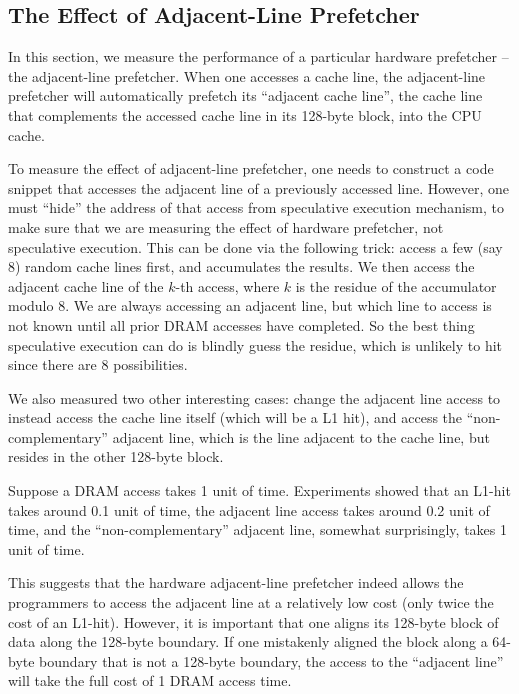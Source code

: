 \documentclass[11pt, usletter]{article}
\begin{document}
\subsection{The Effect of Adjacent-Line Prefetcher} \label{adjlineprefetcher}

In this section, we measure the performance of a particular hardware prefetcher -- the adjacent-line prefetcher. 
When one accesses a cache line, the adjacent-line prefetcher will automatically prefetch 
its ``adjacent cache line'', the cache line that complements the accessed cache line in its 128-byte block, 
into the CPU cache. 

To measure the effect of adjacent-line prefetcher, one needs to construct a code snippet 
that accesses the adjacent line of a previously accessed line. 
However, one must ``hide'' the address of that access from speculative execution mechanism, 
to make sure that we are measuring the effect of hardware prefetcher, not speculative execution. 
This can be done via the following trick: 
access a few (say 8) random cache lines first, and accumulates the results. 
We then access the adjacent cache line of the $k$-th access, where $k$ is the residue of the accumulator modulo 8. 
We are always accessing an adjacent line, 
but which line to access is not known until all prior DRAM accesses have completed.
So the best thing speculative execution can do is blindly guess the residue, 
which is unlikely to hit since there are 8 possibilities. 

We also measured two other interesting cases: 
change the adjacent line access to instead access the cache line itself (which will be a L1 hit), 
and access the ``non-complementary'' adjacent line, which is the line adjacent to the cache line, 
but resides in the other 128-byte block.

Suppose a DRAM access takes 1 unit of time. 
Experiments showed that an L1-hit takes around 0.1 unit of time, 
the adjacent line access takes around 0.2 unit of time, 
and the ``non-complementary'' adjacent line, somewhat surprisingly, takes 1 unit of time.

This suggests that the hardware adjacent-line prefetcher indeed allows 
the programmers to access the adjacent line at a relatively low cost (only twice the cost of an L1-hit). 
However, it is important that one aligns its 128-byte block of data along the 128-byte boundary. 
If one mistakenly aligned the block along a 64-byte boundary that is not a 128-byte boundary,
the access to the ``adjacent line'' will take the full cost of 1 DRAM access time. 
\end{document}
